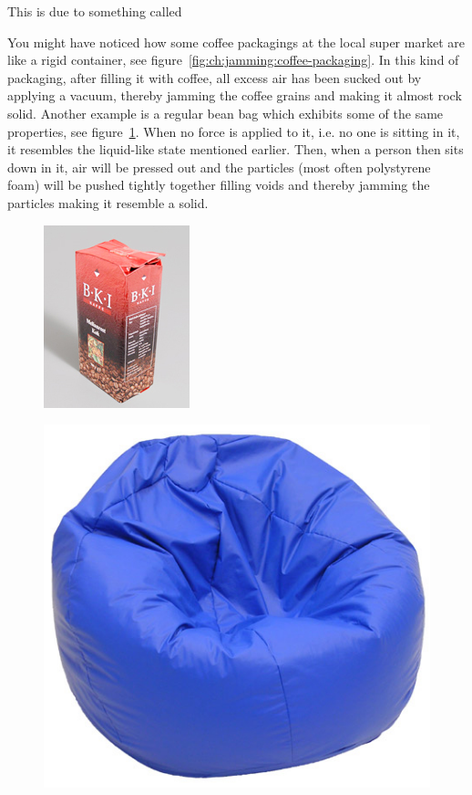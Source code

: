 This is due to something called 

You might have noticed how some coffee packagings at the local super market are like a rigid container, see figure~\ref{fig:ch:jamming:coffee-packaging}. 
In this kind of packaging, after filling it with coffee, all excess air has been sucked out by applying a vacuum, thereby jamming the coffee grains and making it almost rock solid. 
Another example is a regular bean bag which exhibits some of the same properties, see figure~\ref{fig:ch:jamming:bean-bag}. 
When no force is applied to it, i.e. no one is sitting in it, it resembles the liquid-like state mentioned earlier. 
Then, when a person then sits down in it, air will be pressed out and the particles (most often polystyrene foam) will be pushed tightly together filling voids and thereby jamming the particles making it resemble a solid.

\begin{figure}[h]
\centering
\begin{minipage}[t]{.45\textwidth}
  \centering
  \includegraphics[width=.5\linewidth]{figures/jamming/coffee_packaging}
  \label{fig:ch:jamming:coffee-packaging}
\end{minipage}%
\hspace{0.5cm}
\begin{minipage}[t]{.45\textwidth}
  \centering
  \includegraphics[width=.5\linewidth]{figures/jamming/bean_bag}
  \label{fig:ch:jamming:bean-bag}
\end{minipage}
\end{figure}

